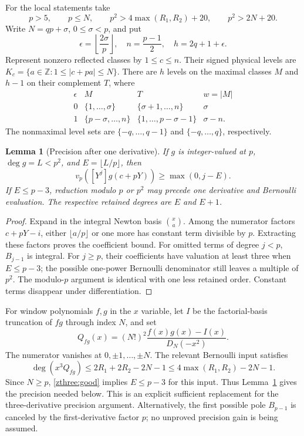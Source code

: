 \documentclass[11pt]{article}
\newtheorem{lemma}[theorem]{Lemma}
\theoremstyle{definition}\newtheorem{definition}[theorem]{Definition}
\theoremstyle{remark}\newtheorem{remark}[theorem]{Remark}
\begin{document}
For the local statements take
\begin{equation}\label{zthree:good}
 p>5,\qquad p\le N,\qquad
 p^2>4\max(R_1,R_2)+20,\qquad p^2>2N+20.
\end{equation}
Write $N=qp+\sigma$, $0\le\sigma<p$, and put
\[
 \epsilon=\left\lfloor\frac{2\sigma}{p}\right\rfloor,
 \quad n=\frac{p-1}{2},\quad h=2q+1+\epsilon.
\]
Represent nonzero reflected classes by $1\le c\le n$. Their signed
physical levels are $K_c=\{a\in\mathbb Z:1\le|c+pa|\le N\}$.
There are $h$ levels on the maximal classes $M$ and $h-1$ on their
complement $T$, where
\begin{equation}\label{zthree:classes}
\begin{array}{c|c|c|c}
\epsilon&M&T&w=|M|\\\hline
0&\{1,\ldots,\sigma\}&\{\sigma+1,\ldots,n\}&\sigma\\
1&\{p-\sigma,\ldots,n\}&\{1,\ldots,p-\sigma-1\}&\sigma-n.
\end{array}
\end{equation}
The nonmaximal level sets are $\{-q,\ldots,q-1\}$ and
$\{-q,\ldots,q\}$, respectively.

\begin{lemma}[Precision after one derivative]\label{zthree:precision}
If $g$ is integer-valued at $p$, $\deg g=L<p^2$, and
$E=\lfloor L/p\rfloor$, then
\[
 v_p([Y^j]g(c+pY))\ge\max(0,j-E).
\]
If $E\le p-3$, reduction modulo $p$ or $p^2$ may precede one derivative
and Bernoulli evaluation. The respective retained degrees are $E$ and
$E+1$.
\end{lemma}
\begin{proof}
Expand in the integral Newton basis $\binom xa$. Among the numerator
factors $c+pY-i$, either $\lfloor a/p\rfloor$ or one more has constant
term divisible by $p$. Extracting these factors proves the coefficient
bound. For omitted terms of degree $j<p$, $B_{j-1}$ is integral.
For $j\ge p$, their coefficients have valuation at least three when
$E\le p-3$; the possible one-power Bernoulli denominator still leaves
a multiple of $p^2$. The modulo-$p$ argument is identical with one
less retained order. Constant terms disappear under differentiation.
\end{proof}

For window polynomials $f,g$ in the $x$ variable, let $I$ be the
factorial-basis truncation of $fg$ through index $N$, and set
\begin{equation}\label{zthree:quotient}
 Q_{fg}(x)=(N!)^2\frac{f(x)g(x)-I(x)}{D_N(-x^2)}.
\end{equation}
The numerator vanishes at $0,\pm1,\ldots,\pm N$. The relevant
Bernoulli input satisfies
\[
 \deg(x^3Q_{fg})\le2R_1+2R_2-2N-1
                  \le4\max(R_1,R_2)-2N-1.
\]
Since $N\ge p$, \eqref{zthree:good} implies $E\le p-3$ for this
input. Thus Lemma~\ref{zthree:precision} gives the precision needed
below. This is an explicit sufficient replacement for the
three-derivative precision argument. Alternatively, the first possible
pole $B_{p-1}$ is canceled by the first-derivative factor $p$; no
unproved precision gain is being assumed.
\end{document}
